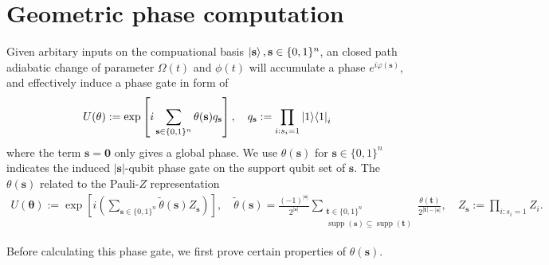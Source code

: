 \section{Geometric phase computation}
Given arbitary inputs on the compuational basis $\ket{\mathbf{s}}, \mathbf{s} \in \{0,1\}^n$,
an closed path adiabatic change of parameter $\Omega(t)$ and $\phi(t)$ will accumulate a phase $e^{i\varphi(\mathbf{s})}$, and effectively induce a phase gate in form of
\begin{align}
    U(\mathbf{\theta}) := \exp \left[i\sum_{\mathbf{s}\in\{0,1\}^n}\theta(\mathbf{s}) q_{\mathbf{s}}\right],\quad
    q_{\mathbf{s}} := \prod_{i: s_i = 1} \ket{1}\!\bra{1}_i
\end{align}
where the term $\mathbf{s}=\mathbf{0}$ only gives a global phase. We use $\theta(\mathbf{s})$ for $\mathbf{s} \in \{0,1\}^n$ indicates the induced $|\mathbf{s}|$-qubit phase gate on the support qubit set of $\mathbf{s}$. 
The $\theta(\mathbf{s})$ related to the Pauli-$Z$ representation 
\begin{align}
    U(\mathbf{\theta}) := \exp \left[i\left(\sum_{\mathbf{s}\in\{0,1\}^n} \tilde{\theta}(\mathbf{s}) Z_{\mathbf{s}}  \right)\right], \quad
    \tilde{\theta}(\mathbf{s})
    = \frac{(-1)^{|\mathbf{s}|}}{2^{|\mathbf{s}|}}
    \sum_{\substack{\mathbf{t}\in\{0,1\}^n\\ \operatorname{supp}(\mathbf{s})\subseteq \operatorname{supp}(\mathbf{t})}}
    \frac{\theta(\mathbf{t})}{2^{|\mathbf{t}|-|\mathbf{s}|}},
    \quad Z_{\mathbf{s}}:=\prod_{i:s_i=1}Z_i .
\end{align}

Before calculating this phase gate, we first prove certain properties of $\theta(\mathbf{s})$.

